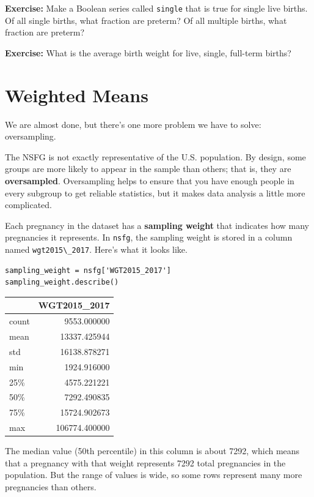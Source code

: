 \textbf{Exercise:} Make a Boolean series called
\passthrough{\lstinline!single!} that is true for single live births. Of
all single births, what fraction are preterm? Of all multiple births,
what fraction are preterm?

\textbf{Exercise:} What is the average birth weight for live, single,
full-term births?

\hypertarget{weighted-means}{%
\section{Weighted Means}\label{weighted-means}}

We are almost done, but there's one more problem we have to solve:
oversampling.

The NSFG is not exactly representative of the U.S. population. By
design, some groups are more likely to appear in the sample than others;
that is, they are \textbf{oversampled}. Oversampling helps to ensure
that you have enough people in every subgroup to get reliable
statistics, but it makes data analysis a little more complicated.

Each pregnancy in the dataset has a \textbf{sampling weight} that
indicates how many pregnancies it represents. In
\passthrough{\lstinline!nsfg!}, the sampling weight is stored in a
column named \passthrough{\lstinline!wgt2015\_2017!}. Here's what it
looks like.

\begin{lstlisting}[]
sampling_weight = nsfg['WGT2015_2017']
sampling_weight.describe()
\end{lstlisting}

\begin{tabular}{lr}
\midrule
{} &   WGT2015\_2017 \\
\midrule
count &    9553.000000 \\
mean  &   13337.425944 \\
std   &   16138.878271 \\
min   &    1924.916000 \\
25\%   &    4575.221221 \\
50\%   &    7292.490835 \\
75\%   &   15724.902673 \\
max   &  106774.400000 \\
\midrule
\end{tabular}

The median value (50th percentile) in this column is about 7292, which
means that a pregnancy with that weight represents 7292 total
pregnancies in the population. But the range of values is wide, so some
rows represent many more pregnancies than others.

